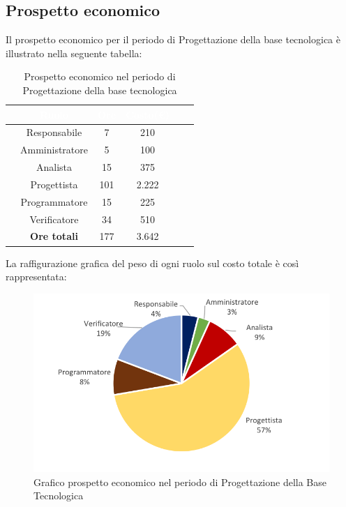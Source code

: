 \subsection{Prospetto economico}
Il prospetto economico per il periodo di Progettazione della base tecnologica è illustrato nella seguente tabella:

\begin{table}[ht]
	\begin{center}
		\begin{tabular}{cccccc}
			\rowcolor{coolblack}
			\hline
			&\textcolor{white}{Ruolo}&	\textcolor{white}{Ore} &\textcolor{white}{Costo(\euro)} \\
			\hline
			&Responsabile           &7&210 \\
			&Amministratore        & 5& 100 \\
			&Analista                   & 15& 375 \\
			&Progettista              &  101& 2.222\\
			&Programmatore       & 15& 225 \\
			&Verificatore             & 34& 510 \\
			\hline
			&\textbf{Ore totali}    &177&3.642\\
		\end{tabular}
		\caption{Prospetto economico nel periodo di Progettazione della base tecnologica}
	\end{center}
\end{table}


La raffigurazione grafica del peso di ogni ruolo sul costo totale è così rappresentata:
\begin{figure}[!ht]
	\begin{center}
		\includegraphics[scale=0.90]{images/grafoProgettazioneTecnologicaEuro.png}
		\caption{Grafico prospetto economico nel periodo di Progettazione della Base Tecnologica}
	\end{center}
\end{figure}
\newpage
